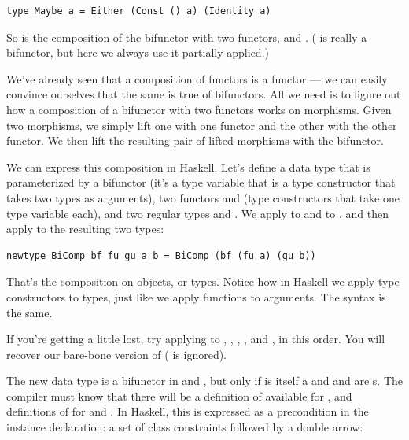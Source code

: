 \begin{Verbatim}[commandchars=\\\{\}]
type Maybe a = Either (Const () a) (Identity a)
\end{Verbatim}
So  is the composition of the bifunctor 
with two functors,  and .
( is really a bifunctor, but here we always use it
partially applied.)

We've already seen that a composition of functors is a functor --- we
can easily convince ourselves that the same is true of bifunctors. All
we need is to figure out how a composition of a bifunctor with two
functors works on morphisms. Given two morphisms, we simply lift one
with one functor and the other with the other functor. We then lift the
resulting pair of lifted morphisms with the bifunctor.

We can express this composition in Haskell. Let's define a data type
that is parameterized by a bifunctor  (it's a type variable
that is a type constructor that takes two types as arguments), two
functors  and  (type constructors that take one
type variable each), and two regular types  and . We
apply  to  and  to , and then
apply  to the resulting two types:

\begin{Verbatim}[commandchars=\\\{\}]
newtype BiComp bf fu gu a b = BiComp (bf (fu a) (gu b))
\end{Verbatim}
That's the composition on objects, or types. Notice how in Haskell we
apply type constructors to types, just like we apply functions to
arguments. The syntax is the same.

If you're getting a little lost, try applying  to
, , , , and
, in this order. You will recover our bare-bone version of
 ( is ignored).

The new data type  is a bifunctor in  and
, but only if  is itself a  and
 and  are s. The compiler must
know that there will be a definition of  available for
, and definitions of  for  and
. In Haskell, this is expressed as a precondition in the
instance declaration: a set of class constraints followed by a double
arrow:

